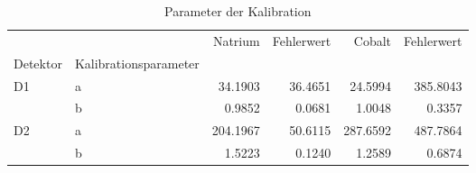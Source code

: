 \documentclass[%
aps,
onecolumn,
11pt,
tightenlines,
nofootinbib,
superscriptaddress,
floatfix,
prd,
]{revtex4-2}
\begin{document}

\begin{table}[H]
	\centering
	\begin{tabular}{llrrrr}
	\toprule
	 &  & Natrium & Fehlerwert & Cobalt & Fehlerwert \\
	Detektor & Kalibrationsparameter &  &  &  &  \\
	\midrule
	\multirow[t]{2}{*}{D1} & a & 34.1903 & 36.4651 & 24.5994 & 385.8043 \\
	 & b & 0.9852 & 0.0681 & 1.0048 & 0.3357 \\
	\cline{1-6}
	\multirow[t]{2}{*}{D2} & a & 204.1967 & 50.6115 & 287.6592 & 487.7864 \\
	 & b & 1.5223 & 0.1240 & 1.2589 & 0.6874 \\
	\cline{1-6}
	\bottomrule
	\end{tabular}
\caption{Parameter der Kalibration}
\label{tab:calibration}
\end{table}

%
\end{document}
